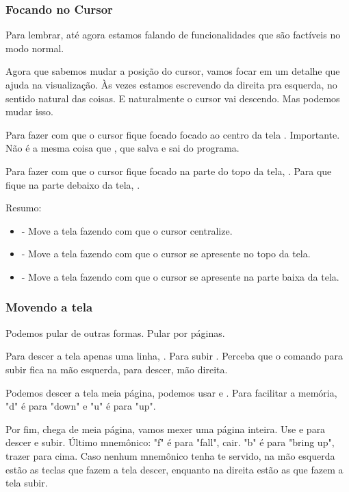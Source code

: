 \documentclass[a4paper, 12pt]{article}
\begin{document}
\subsubsection{Focando no Cursor}
Para lembrar, até agora estamos falando de funcionalidades que são factíveis no modo normal.

Agora que sabemos mudar a posição do cursor, vamos focar em um detalhe que ajuda na visualização.
Às vezes estamos escrevendo da direita pra esquerda, no sentido natural das coisas.
E naturalmente o cursor vai descendo.
Mas podemos mudar isso.

Para fazer com que o cursor fique focado focado ao centro da tela .
Importante. Não é a mesma coisa que , que salva e sai do programa.

Para fazer com que o cursor fique focado na parte do topo da tela, .
Para que fique na parte debaixo da tela, .

Resumo:
\begin{itemize}
    \item {} - Move a tela fazendo com que o cursor centralize.
    \item {} - Move a tela fazendo com que o cursor se apresente no topo da tela.
    \item {} - Move a tela fazendo com que o cursor se apresente na parte baixa da tela.
\end{itemize}

\subsubsection{Movendo a tela}
Podemos pular de outras formas. Pular por páginas.

Para descer a tela apenas uma linha, . Para subir .
Perceba que o comando para subir fica na mão esquerda, para descer, mão direita.

Podemos descer a tela meia página, podemos usar  e .
Para facilitar a memória, "d" é para "down" e "u" é para "up".

Por fim, chega de meia página, vamos mexer uma página inteira.
Use  e  para descer e subir.
Último mnemônico: "f" é para "fall", cair.
"b" é para "bring up", trazer para cima.
Caso nenhum mnemônico tenha te servido,
na mão esquerda estão as teclas que fazem a tela descer,
enquanto na direita estão as que fazem a tela subir.
\end{document}
